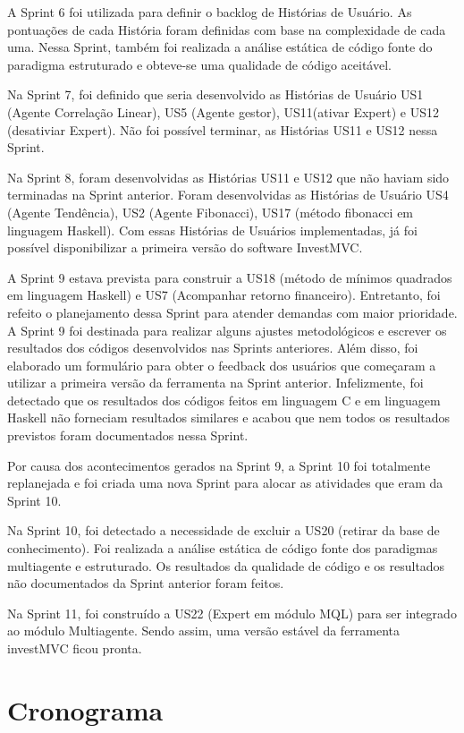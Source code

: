 A Sprint 6 foi utilizada para definir o backlog de Histórias de Usuário. As pontuações de cada História foram definidas com base na complexidade de cada uma. Nessa Sprint, também foi realizada a análise estática de código fonte do paradigma estruturado e obteve-se uma qualidade de código aceitável.

Na Sprint 7, foi definido que seria desenvolvido as Histórias de Usuário US1 (Agente Correlação Linear), US5 (Agente gestor), US11(ativar Expert) e US12 (desativiar Expert). Não foi possível terminar, as Histórias US11 e US12 nessa Sprint.

Na Sprint 8, foram desenvolvidas as Histórias US11 e US12 que não haviam sido terminadas na Sprint anterior. Foram desenvolvidas as Histórias de Usuário US4 (Agente Tendência), US2 (Agente Fibonacci), US17 (método fibonacci em linguagem Haskell). Com essas Histórias de Usuários implementadas, já foi possível disponibilizar a primeira versão do software InvestMVC.

A Sprint 9 estava prevista para construir a US18 (método de mínimos quadrados em linguagem Haskell) e US7 (Acompanhar retorno financeiro). Entretanto, foi refeito o planejamento dessa Sprint para atender demandas com maior prioridade. A Sprint 9 foi destinada para realizar alguns ajustes metodológicos e escrever os resultados dos códigos desenvolvidos nas Sprints anteriores. Além disso, foi elaborado um formulário para obter o feedback dos usuários que começaram a utilizar a primeira versão da ferramenta na Sprint anterior. Infelizmente, foi detectado que os resultados dos códigos feitos em linguagem C e em linguagem Haskell não forneciam resultados similares e acabou que nem todos os resultados previstos foram documentados nessa Sprint.

Por causa dos acontecimentos gerados na Sprint 9, a Sprint 10 foi totalmente replanejada e foi criada uma nova Sprint para alocar as atividades que eram da Sprint 10.

Na Sprint 10, foi detectado a necessidade de excluir a US20 (retirar da base de conhecimento). Foi realizada a análise estática de código fonte dos paradigmas multiagente e estruturado. Os resultados da qualidade de código e os resultados não documentados da Sprint anterior foram feitos.

Na Sprint 11, foi construído a US22 (Expert em módulo MQL) para ser integrado ao módulo Multiagente. Sendo assim, uma versão estável da ferramenta investMVC ficou pronta.

\section{Cronograma}

